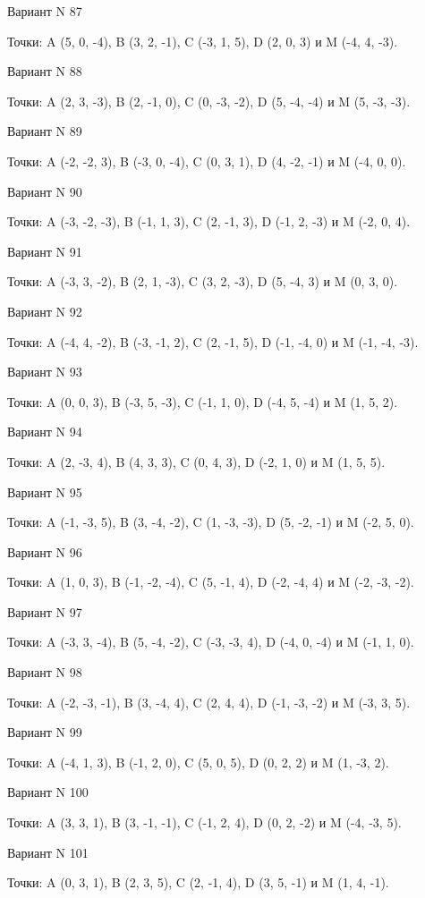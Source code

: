 \documentclass[11pt]{report}
\begin{document}
Вариант N 87

Точки: A (5, 0, -4), B (3, 2, -1), C (-3, 1, 5), D (2, 0, 3) и M (-4, 4, -3).

Вариант N 88

Точки: A (2, 3, -3), B (2, -1, 0), C (0, -3, -2), D (5, -4, -4) и M (5, -3, -3).

Вариант N 89

Точки: A (-2, -2, 3), B (-3, 0, -4), C (0, 3, 1), D (4, -2, -1) и M (-4, 0, 0).

Вариант N 90

Точки: A (-3, -2, -3), B (-1, 1, 3), C (2, -1, 3), D (-1, 2, -3) и M (-2, 0, 4).

Вариант N 91

Точки: A (-3, 3, -2), B (2, 1, -3), C (3, 2, -3), D (5, -4, 3) и M (0, 3, 0).

Вариант N 92

Точки: A (-4, 4, -2), B (-3, -1, 2), C (2, -1, 5), D (-1, -4, 0) и M (-1, -4, -3).

Вариант N 93

Точки: A (0, 0, 3), B (-3, 5, -3), C (-1, 1, 0), D (-4, 5, -4) и M (1, 5, 2).

Вариант N 94

Точки: A (2, -3, 4), B (4, 3, 3), C (0, 4, 3), D (-2, 1, 0) и M (1, 5, 5).

Вариант N 95

Точки: A (-1, -3, 5), B (3, -4, -2), C (1, -3, -3), D (5, -2, -1) и M (-2, 5, 0).

Вариант N 96

Точки: A (1, 0, 3), B (-1, -2, -4), C (5, -1, 4), D (-2, -4, 4) и M (-2, -3, -2).

Вариант N 97

Точки: A (-3, 3, -4), B (5, -4, -2), C (-3, -3, 4), D (-4, 0, -4) и M (-1, 1, 0).

Вариант N 98

Точки: A (-2, -3, -1), B (3, -4, 4), C (2, 4, 4), D (-1, -3, -2) и M (-3, 3, 5).

Вариант N 99

Точки: A (-4, 1, 3), B (-1, 2, 0), C (5, 0, 5), D (0, 2, 2) и M (1, -3, 2).

Вариант N 100

Точки: A (3, 3, 1), B (3, -1, -1), C (-1, 2, 4), D (0, 2, -2) и M (-4, -3, 5).

Вариант N 101

Точки: A (0, 3, 1), B (2, 3, 5), C (2, -1, 4), D (3, 5, -1) и M (1, 4, -1).
\end{document}
